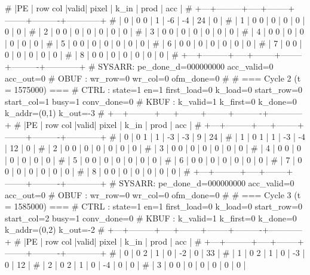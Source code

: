 # |PE | row col |valid| pixel  |  k_in  |   prod   |    acc     |
# +---+---------+-----+--------+--------+----------+------------+
# | 0 |   0   0 |  1  |     -6 |     -4 |       24 |          0 |
# | 1 |   0   0 |  0  |      0 |      0 |        0 |          0 |
# | 2 |   0   0 |  0  |      0 |      0 |        0 |          0 |
# | 3 |   0   0 |  0  |      0 |      0 |        0 |          0 |
# | 4 |   0   0 |  0  |      0 |      0 |        0 |          0 |
# | 5 |   0   0 |  0  |      0 |      0 |        0 |          0 |
# | 6 |   0   0 |  0  |      0 |      0 |        0 |          0 |
# | 7 |   0   0 |  0  |      0 |      0 |        0 |          0 |
# | 8 |   0   0 |  0  |      0 |      0 |        0 |          0 |
# +---+---------+-----+--------+--------+----------+------------+
# SYSARR: pe_done_d=000000000 acc_valid=0 acc_out=0
# OBUF : wr_row=0 wr_col=0 ofm_done=0
# 
# === Cycle 2  (t = 1575000) ===
# CTRL : state=1 en=1 first_load=0 k_load=0 start_row=0 start_col=1 busy=1 conv_done=0
# KBUF : k_valid=1 k_first=0 k_done=0 k_addr=(0,1) k_out=-3
# +---+---------+-----+--------+--------+----------+------------+
# |PE | row col |valid| pixel  |  k_in  |   prod   |    acc     |
# +---+---------+-----+--------+--------+----------+------------+
# | 0 |   0   1 |  1  |     -3 |     -3 |        9 |         24 |
# | 1 |   0   1 |  1  |     -3 |     -4 |       12 |          0 |
# | 2 |   0   0 |  0  |      0 |      0 |        0 |          0 |
# | 3 |   0   0 |  0  |      0 |      0 |        0 |          0 |
# | 4 |   0   0 |  0  |      0 |      0 |        0 |          0 |
# | 5 |   0   0 |  0  |      0 |      0 |        0 |          0 |
# | 6 |   0   0 |  0  |      0 |      0 |        0 |          0 |
# | 7 |   0   0 |  0  |      0 |      0 |        0 |          0 |
# | 8 |   0   0 |  0  |      0 |      0 |        0 |          0 |
# +---+---------+-----+--------+--------+----------+------------+
# SYSARR: pe_done_d=000000000 acc_valid=0 acc_out=0
# OBUF : wr_row=0 wr_col=0 ofm_done=0
# 
# === Cycle 3  (t = 1585000) ===
# CTRL : state=1 en=1 first_load=0 k_load=0 start_row=0 start_col=2 busy=1 conv_done=0
# KBUF : k_valid=1 k_first=0 k_done=0 k_addr=(0,2) k_out=-2
# +---+---------+-----+--------+--------+----------+------------+
# |PE | row col |valid| pixel  |  k_in  |   prod   |    acc     |
# +---+---------+-----+--------+--------+----------+------------+
# | 0 |   0   2 |  1  |      0 |     -2 |        0 |         33 |
# | 1 |   0   2 |  1  |      0 |     -3 |        0 |         12 |
# | 2 |   0   2 |  1  |      0 |     -4 |        0 |          0 |
# | 3 |   0   0 |  0  |      0 |      0 |        0 |          0 |
